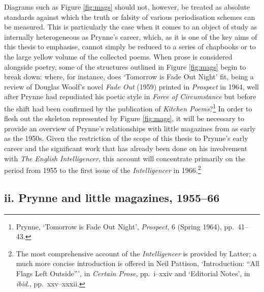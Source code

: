 \documentclass[]{article}
\begin{document}
Diagrams such as Figure \ref{fig:mags} should not, however, be treated
as absolute standards against which the truth or falsity of various
periodisation schemes can be measured. This is particularly the case
when it comes to an object of study as internally heterogeneous as
Prynne’s career, which, as it is one of the key aims of this thesis to
emphasise, cannot simply be reduced to a series of chapbooks or to the
large yellow volume of the collected poems. When prose is considered
alongside poetry, some of the structures outlined in Figure
\ref{fig:mags} begin to break down: where, for instance, does ‘Tomorrow
is Fade Out Night’ fit, being a review of Douglas Woolf’s novel
\emph{Fade Out} (1959) printed in \emph{Prospect} in 1964, well after
Prynne had repudiated his poetic style in \emph{Force of Circumstance}
but before the shift had been confirmed by the publication of
\emph{Kitchen Poems}?\footnote{Prynne, ‘Tomorrow is Fade Out Night’,
  \emph{Prospect}, 6 (Spring 1964), pp.~41–43.} In order to flesh out
the skeleton represented by Figure \ref{fig:mags}, it will be necessary
to provide an overview of Prynne’s relationships with little magazines
from as early as the 1950s. Given the restriction of the scope of this
thesis to Prynne’s early career and the significant work that has
already been done on his involvement with \emph{The English
Intelligencer}, this account will concentrate primarily on the period
from 1955 to the first issue of the \emph{Intelligencer} in
1966.\footnote{The most comprehensive account of the
  \emph{Intelligencer} is provided by Latter; a much more concise
  introduction is offered in Neil Pattison, ‘Introduction: “All Flags
  Left Outside”’, in \emph{Certain Prose}, pp.~i–xxiv and ‘Editorial
  Notes’, in \emph{ibid}., pp.~xxv–xxxii.}

\subsection{ii. Prynne and little magazines,
1955–66}\label{ii.-prynne-and-little-magazines-195566}
\end{document}
